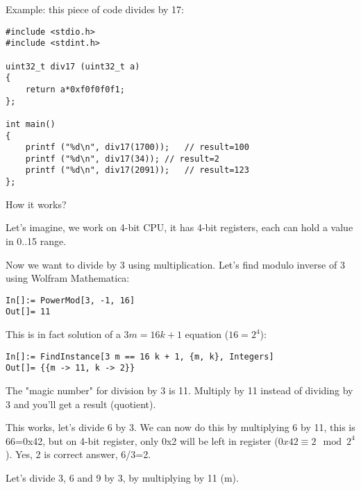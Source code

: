 
\leveldown{}

Example: this piece of code divides by 17:

\begin{lstlisting}[style=customc]
#include <stdio.h>
#include <stdint.h>

uint32_t div17 (uint32_t a)
{
	return a*0xf0f0f0f1;
};

int main()
{
	printf ("%d\n", div17(1700));	// result=100
	printf ("%d\n", div17(34));	// result=2
	printf ("%d\n", div17(2091));	// result=123
};
\end{lstlisting}

How it works?

\myhrule{}

Let's imagine, we work on 4-bit CPU, it has 4-bit registers, each can hold a value in 0..15 range.

Now we want to divide by 3 using multiplication.
Let's find modulo inverse of 3 using Wolfram Mathematica:

\begin{lstlisting}
In[]:= PowerMod[3, -1, 16]
Out[]= 11
\end{lstlisting}

This is in fact solution of a $3m=16k+1$ equation ($16 = 2^4$):

\begin{lstlisting}
In[]:= FindInstance[3 m == 16 k + 1, {m, k}, Integers]
Out[]= {{m -> 11, k -> 2}}
\end{lstlisting}

The "magic number" for division by 3 is 11. Multiply by 11 instead of dividing by 3 and you'll get a result (quotient).

This works, let's divide 6 by 3. We can now do this by multiplying 6 by 11, this is 66=0x42,
but on 4-bit register, only 0x2 will be left in register ($0x42 \equiv 2 \mod 2^4$).
Yes, 2 is correct answer, 6/3=2.

Let's divide 3, 6 and 9 by 3, by multiplying by 11 (m).

\iffalse
\begin{lstlisting}[basicstyle=\tiny]
           |123456789abcdef0|123456789abcdef0|123456789abcdef0|123456789abcdef0|123456789abcdef0|123456789abcdef0|123456789abcdef0|
    m=11   |***********     |                |                |                |                |                |                |
3/3 3m=33  |****************|****************|*               |                |                |                |                |
6/3 6m=66  |****************|****************|****************|****************|**              |                |                |
9/3 9m=99  |****************|****************|****************|****************|****************|****************|***             |
\end{lstlisting}
\fi

